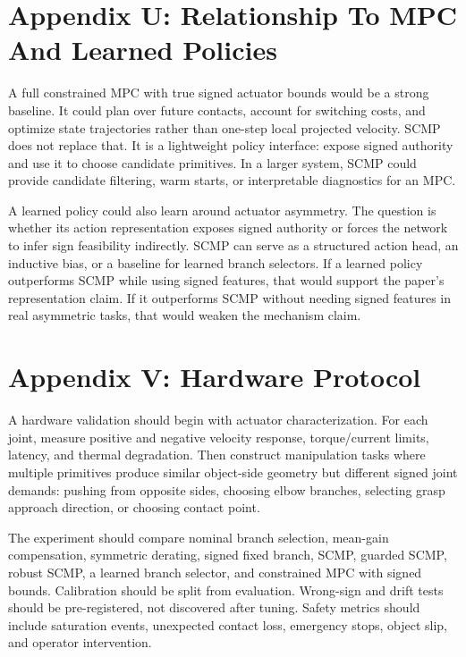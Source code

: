 \documentclass{article}
\begin{document}
\section{Appendix U: Relationship To MPC And Learned Policies}

A full constrained MPC with true signed actuator bounds would be a strong baseline. It could plan over future contacts, account for switching costs, and optimize state trajectories rather than one-step local projected velocity. SCMP does not replace that. It is a lightweight policy interface: expose signed authority and use it to choose candidate primitives. In a larger system, SCMP could provide candidate filtering, warm starts, or interpretable diagnostics for an MPC.

A learned policy could also learn around actuator asymmetry. The question is whether its action representation exposes signed authority or forces the network to infer sign feasibility indirectly. SCMP can serve as a structured action head, an inductive bias, or a baseline for learned branch selectors. If a learned policy outperforms SCMP while using signed features, that would support the paper's representation claim. If it outperforms SCMP without needing signed features in real asymmetric tasks, that would weaken the mechanism claim.

\section{Appendix V: Hardware Protocol}

A hardware validation should begin with actuator characterization. For each joint, measure positive and negative velocity response, torque/current limits, latency, and thermal degradation. Then construct manipulation tasks where multiple primitives produce similar object-side geometry but different signed joint demands: pushing from opposite sides, choosing elbow branches, selecting grasp approach direction, or choosing contact point.

The experiment should compare nominal branch selection, mean-gain compensation, symmetric derating, signed fixed branch, SCMP, guarded SCMP, robust SCMP, a learned branch selector, and constrained MPC with signed bounds. Calibration should be split from evaluation. Wrong-sign and drift tests should be pre-registered, not discovered after tuning. Safety metrics should include saturation events, unexpected contact loss, emergency stops, object slip, and operator intervention.
\end{document}

